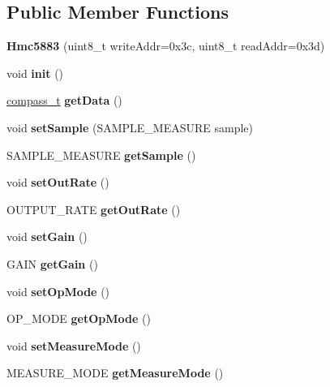 \subsection*{Public Member Functions}
\begin{DoxyCompactItemize}
\item 
\mbox{\label{classHmc5883_ac524eb35511c0cc1af4fde7c25ce6bc8}} 
{\bfseries Hmc5883} (uint8\+\_\+t write\+Addr=0x3c, uint8\+\_\+t read\+Addr=0x3d)
\item 
\mbox{\label{classHmc5883_ab21eb9fe07af129ca5f838b568183d7b}} 
void {\bfseries init} ()
\item 
\mbox{\label{classHmc5883_a11189f87dac5ff48217551fc76d3c93b}} 
\hyperlink{structcompass__t}{compass\+\_\+t} {\bfseries get\+Data} ()
\item 
\mbox{\label{classHmc5883_a69dbf7355977a9b33ca7910d8f716095}} 
void {\bfseries set\+Sample} (S\+A\+M\+P\+L\+E\+\_\+\+M\+E\+A\+S\+U\+RE sample)
\item 
\mbox{\label{classHmc5883_aa2592ac2bfc5a4e98c13ed278fa8f414}} 
S\+A\+M\+P\+L\+E\+\_\+\+M\+E\+A\+S\+U\+RE {\bfseries get\+Sample} ()
\item 
\mbox{\label{classHmc5883_af850118d4a20b7622aa796d8dbca5662}} 
void {\bfseries set\+Out\+Rate} ()
\item 
\mbox{\label{classHmc5883_a692ad42338c883012ec5b11347e1bfd8}} 
O\+U\+T\+P\+U\+T\+\_\+\+R\+A\+TE {\bfseries get\+Out\+Rate} ()
\item 
\mbox{\label{classHmc5883_a106b6982d67ef293f8f4d7f5dd3bff46}} 
void {\bfseries set\+Gain} ()
\item 
\mbox{\label{classHmc5883_a9a2dc9a1b419a096ebf7aacb1a2e0ef3}} 
G\+A\+IN {\bfseries get\+Gain} ()
\item 
\mbox{\label{classHmc5883_a4f244d6aa1a8f37f7ca77bc4d456ba85}} 
void {\bfseries set\+Op\+Mode} ()
\item 
\mbox{\label{classHmc5883_a522657db88177c0cca2b64741f796e7d}} 
O\+P\+\_\+\+M\+O\+DE {\bfseries get\+Op\+Mode} ()
\item 
\mbox{\label{classHmc5883_a3264769daed5ee49c9ce3011b07abc3d}} 
void {\bfseries set\+Measure\+Mode} ()
\item 
\mbox{\label{classHmc5883_ac514cf477af1b8f325bc9d3d7837d5ff}} 
M\+E\+A\+S\+U\+R\+E\+\_\+\+M\+O\+DE {\bfseries get\+Measure\+Mode} ()
\end{DoxyCompactItemize}

